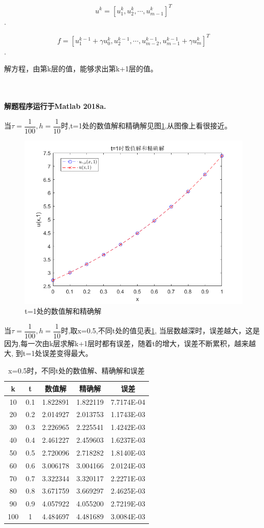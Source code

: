 \documentclass[withoutpreface,bwprint]{cumcmthesis} %
\begin{document}
	
	$$u^k=[u_1^k,u_2^k,\cdots,u_{m-1}^k]^T$$.
	
	$$f=[u_1^{k-1}+\gamma u_0^k,u_2^{k-1},\cdots,u_{m-2}^{k-1},u_{m-1}^{k-1}+\gamma u_m^k]^T$$.
	
	
	解方程，由第k层的值，能够求出第k+1层的值。
	
	~\\
	~\\
	
	
	\textbf{解题程序运行于Matlab 2018a.}
	
	当$\tau=\dfrac{1}{100},h=\dfrac{1}{10}$时,t=1处的数值解和精确解见图\ref{fig:f1},从图像上看很接近。
	\begin{figure}
		\centering
		\includegraphics[width=0.7\linewidth]{figures/f1}
		\caption{t=1处的数值解和精确解}
		\label{fig:f1}
	\end{figure}

	当$\tau=\dfrac{1}{100},h=\dfrac{1}{10}$时,取x=0.5,不同t处的值见表\ref{tab:1},
	当层数越深时，误差越大，这是因为,每一次由k层求解k+1层时都有误差，随着t的增大，误差不断累积，越来越大,
	到t=1处误差变得最大。
	\begin{table}[htbp]
		\centering
		\caption{x=0.5时，不同t处的数值解、精确解和误差}
		\begin{tabular}{ccccc}
			\toprule[1.5pt]
			k     & t     & 数值解   & 精确解   & 误差 \\
			\midrule[1pt]
			10    & 0.1   & 1.822891  & 1.822119  & 7.7174E-04 \\
			20    & 0.2   & 2.014927  & 2.013753  & 1.1743E-03 \\
			30    & 0.3   & 2.226965  & 2.225541  & 1.4242E-03 \\
			40    & 0.4   & 2.461227  & 2.459603  & 1.6237E-03 \\
			50    & 0.5   & 2.720096  & 2.718282  & 1.8140E-03 \\
			60    & 0.6   & 3.006178  & 3.004166  & 2.0124E-03 \\
			70    & 0.7   & 3.322344  & 3.320117  & 2.2271E-03 \\
			80    & 0.8   & 3.671759  & 3.669297  & 2.4625E-03 \\
			90    & 0.9   & 4.057922  & 4.055200  & 2.7219E-03 \\
			100   & 1     & 4.484697  & 4.481689  & 3.0084E-03 \\
			\bottomrule[1.5pt]
		\end{tabular}%
		\label{tab:1}%
	\end{table}%
\end{document}
